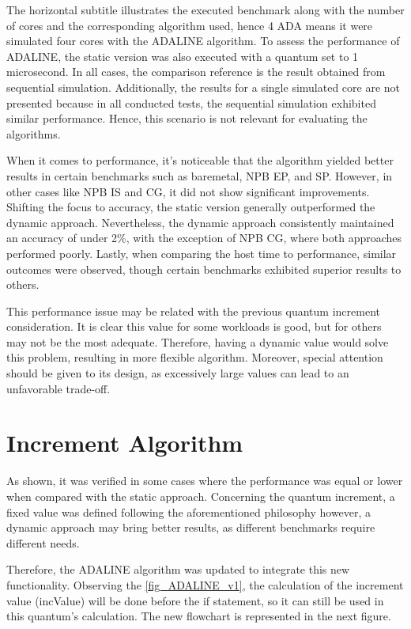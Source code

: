 The horizontal subtitle illustrates the executed benchmark along with the number of cores and the corresponding algorithm used, hence 4 ADA means it were simulated four cores with the ADALINE algorithm. To assess the performance of ADALINE, the static version was also executed with a quantum set to 1 microsecond. In all cases, the comparison reference is the result obtained from sequential simulation. Additionally, the results for a single simulated core are not presented because in all conducted tests, the sequential simulation exhibited similar performance. Hence, this scenario is not relevant for evaluating the algorithms.

When it comes to performance, it's noticeable that the algorithm yielded better results in certain benchmarks such as baremetal, NPB EP, and SP. However, in other cases like NPB IS and CG, it did not show significant improvements. Shifting the focus to accuracy, the static version generally outperformed the dynamic approach. Nevertheless, the dynamic approach consistently maintained an accuracy of under 2\%, with the exception of NPB CG, where both approaches performed poorly. Lastly, when comparing the host time to performance, similar outcomes were observed, though certain benchmarks exhibited superior results to others.

This performance issue may be related with the previous quantum increment consideration. It is clear this value for some workloads is good, but for others may not be the most adequate. Therefore, having a dynamic value would solve this problem, resulting in more flexible algorithm. Moreover, special attention should be given to its design, as excessively large values can lead to an unfavorable trade-off.



\section{Increment Algorithm}

As shown, it was verified in some cases where the performance was equal or lower when compared with the static approach. Concerning the quantum increment, a fixed value was defined following the aforementioned philosophy however, a dynamic approach may bring better results, as different benchmarks require different needs. 

Therefore, the ADALINE algorithm was updated to integrate this new functionality. Observing the \autoref{fig_ADALINE_v1}, the calculation of the increment value (incValue) will be done before the if statement, so it can still be used in this quantum's calculation. The new flowchart is represented in the next figure.

